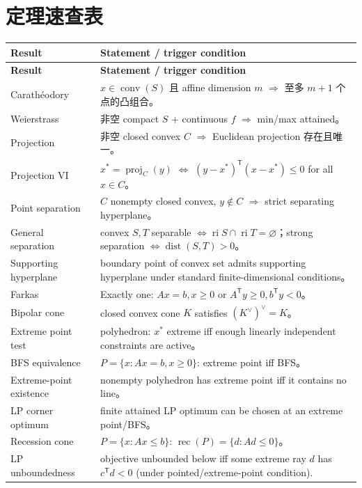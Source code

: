 \documentclass[11pt,a4paper,openany]{ctexrep}
\theoremstyle{definition}
\newcommand{\ri}{\operatorname{ri}}
\newcommand{\conv}{\operatorname{conv}}
\newcommand{\rec}{\operatorname{rec}}
\newcommand{\dist}{\operatorname{dist}}
\newcommand{\proj}{\operatorname{proj}}
\newcommand{\transpose}{\mathsf{T}}
\begin{document}
\chapter{定理速查表}

\begin{longtable}{p{}p{}}
\toprule
\textbf{Result} & \textbf{Statement / trigger condition}\\
\midrule
\endfirsthead
\toprule
\textbf{Result} & \textbf{Statement / trigger condition}\\
\midrule
\endhead
Carath\'eodory & $x\in\conv(S)$ 且 affine dimension $m$ $\Rightarrow$ 至多 $m+1$ 个点的凸组合。\\
Weierstrass & 非空 compact $S$ + continuous $f$ $\Rightarrow$ min/max attained。\\
Projection & 非空 closed convex $C$ $\Rightarrow$ Euclidean projection 存在且唯一。\\
Projection VI & $x^*=\proj_C(y)$ $\Leftrightarrow$ $(y-x^*)^\transpose(x-x^*)\le0$ for all $x\in C$。\\
Point separation & $C$ nonempty closed convex, $y\notin C$ $\Rightarrow$ strict separating hyperplane。\\
General separation & convex $S,T$ separable $\Leftrightarrow \ri S\cap\ri T=\varnothing$；strong separation $\Leftrightarrow\dist(S,T)>0$。\\
Supporting hyperplane & boundary point of convex set admits supporting hyperplane under standard finite-dimensional conditions。\\
Farkas & Exactly one: $Ax=b,x\ge0$ or $A^\transpose y\ge0,b^\transpose y<0$。\\
Bipolar cone & closed convex cone $K$ satisfies $(K^\vee)^\vee=K$。\\
Extreme point test & polyhedron: $x^*$ extreme iff enough linearly independent constraints are active。\\
BFS equivalence & $P=\{x:Ax=b,x\ge0\}$: extreme point iff BFS。\\
Extreme-point existence & nonempty polyhedron has extreme point iff it contains no line。\\
LP corner optimum & finite attained LP optimum can be chosen at an extreme point/BFS。\\
Recession cone & $P=\{x:Ax\le b\}$: $\rec(P)=\{d:Ad\le0\}$。\\
LP unboundedness & objective unbounded below iff some extreme ray $d$ has $c^\transpose d<0$ (under pointed/extreme-point condition).\\

\end{longtable}
\end{document}
